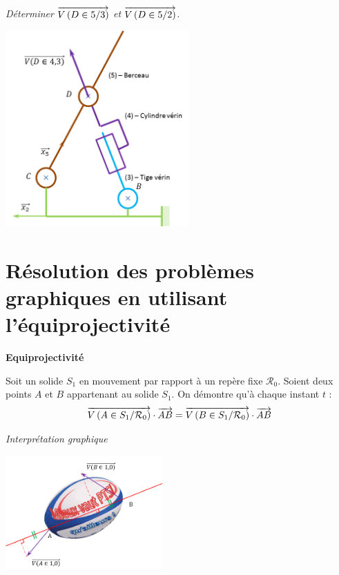 \documentclass[10pt]{article}
\begin{document}
\begin{exemple}
\textit{Déterminer $\overrightarrow{V\left( {D} \in {5}/{3}\right)}$ et $\overrightarrow{V\left( {D} \in {5}/{2}\right)}$.}

\begin{center}
\includegraphics[width=7cm]{images/point}
\end{center}

\end{exemple}
\section{Résolution des problèmes graphiques en utilisant l'équiprojectivité}

\begin{resultat}
\textbf{Equiprojectivité}

Soit un solide $S_1$ en mouvement par rapport à un repère fixe $\mathcal{R}_0$. Soient deux points $A$ et $B$ appartenant au solide $S_1$. On démontre qu'à chaque instant $t$ :
$$
\overrightarrow{V\left( {A} \in {S_1}/{\mathcal{R}_0}\right)}\cdot \overrightarrow{AB} = 
\overrightarrow{V\left( {B} \in {S_1}/{\mathcal{R}_0}\right)}\cdot \overrightarrow{AB}
$$
\end{resultat}

\begin{exemple}
\textit{Interprétation graphique}

\begin{center}
\includegraphics[width=6cm]{images/ballon1}
\end{center}
\end{exemple}
\end{document}
